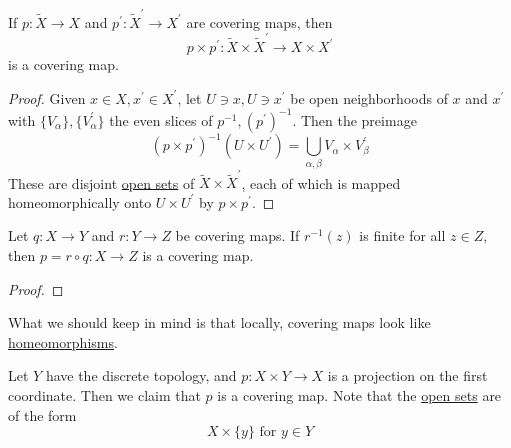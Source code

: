   \begin{theorem}
    \label{thm:product-of-covering-maps}
    If $p: \widetilde{X} \to X$ and $p^\prime : \widetilde{X}^\prime \to X^\prime$ are covering maps, then
    \begin{equation}
      p \times p^\prime : \widetilde{X} \times \widetilde{X}^\prime \to X \times X^\prime
    \end{equation}
    is a covering map.
  \end{theorem}
  \begin{proof}
    Given $x \in X, x^\prime \in X^\prime$, let $U \ni x, U \ni x^\prime$ be open neighborhoods of $x$ and $x^\prime$ with $\{V_\alpha\}, \{V_\alpha^\prime\}$ the even slices of $p^{-1}, (p^\prime)^{-1}$. Then the preimage 
    \begin{equation}
      (p \times p^\prime)^{-1} (U \times U^\prime) = \bigcup_{\alpha, \beta} V_\alpha \times V_\beta^\prime 
    \end{equation}
    These are disjoint \hyperref[pst-def:open-set]{open sets} of $\widetilde{X} \times \widetilde{X}^\prime$, each of which is mapped homeomorphically onto $U \times U^\prime$ by $p \times p^\prime$.
  \end{proof}

  \begin{theorem}
    \label{thm:composition-of-covering-maps}
    Let $q: X \to Y$ and $r: Y \to Z$ be covering maps. If $r^{-1}(z)$ is finite for all $z \in Z$, then $p = r \circ q: X \to Z$ is a covering map. 
  \end{theorem}
  \begin{proof}
    
  \end{proof}

  What we should keep in mind is that locally, covering maps look like \hyperref[pst-def:homeomorphism]{homeomorphisms}. 

  \begin{example}
    \label{ex:projection-of-products-with-discrete-topology}
    Let $Y$ have the discrete topology, and $p: X \times Y \to X$ is a projection on the first coordinate. Then we claim that $p$ is a covering map. Note that the \hyperref[pst-def:open-set]{open sets} are of the form 
    \begin{equation}
      X \times \{y\} \text{ for } y \in Y
    \end{equation}
  \end{example}

